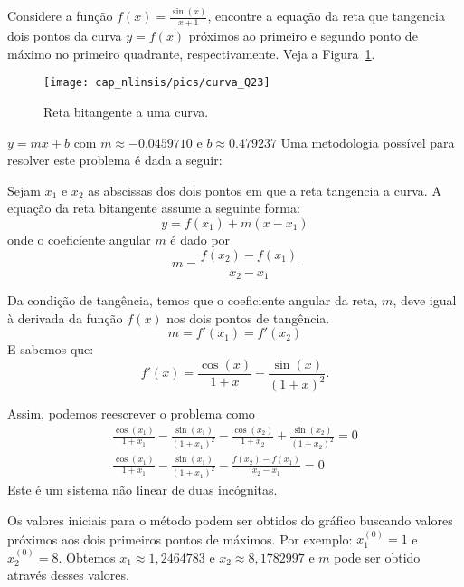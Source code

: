 \begin{exer}\label{prob_bitang}Considere a função $f(x)=\frac{\sin(x)}{x+1}$, encontre a equação da reta que tangencia dois pontos da curva $y=f(x)$ próximos ao primeiro e segundo ponto de máximo no primeiro quadrante, respectivamente. Veja a Figura~\ref{pic:bitang}.
\end{exer}
\begin{figure}
  \centering
  \texttt{[image: cap\_nlinsis/pics/curva\_Q23]}
  \caption{Reta bitangente a uma curva.}
  \label{pic:bitang}
\end{figure}
\begin{resp}
  $y=mx+b$ com $m\approx - 0.0459710 $ e $b\approx 0.479237$
  Uma metodologia possível para resolver este problema é dada a seguir:

  Sejam $x_1$ e $x_2$ as abscissas dos dois pontos em que a reta tangencia a curva. A equação da reta bitangente assume a seguinte forma:
  \begin{equation} y=f(x_1) + m(x-x_1)  \end{equation}
  onde o coeficiente angular $m$ é dado por
  \begin{equation} m=\frac{f(x_2)-f(x_1)}{x_2-x_1} \end{equation}

  Da condição de tangência, temos que o coeficiente angular da reta, $m$, deve igual à derivada da função $f(x)$ nos dois pontos de tangência.
  \begin{equation} m=f'(x_1)=f'(x_2) \end{equation}
  E sabemos que:
  \begin{equation} f'(x)=\frac{\cos(x)}{1+x}-\frac{\sin(x)}{(1+x)^2}. \end{equation}

  Assim, podemos reescrever o problema como
  \begin{eqnarray}
\frac{\cos(x_1)}{1+x_1}-\frac{\sin(x_1)}{(1+x_1)^2}-\frac{\cos(x_2)}{1+x_2}+\frac{\sin(x_2)}{(1+x_2)^2}=0\\
\frac{\cos(x_1)}{1+x_1}-\frac{\sin(x_1)}{(1+x_1)^2}-\frac{f(x_2)-f(x_1)}{x_2-x_1}=0
\end{eqnarray}
Este é um sistema não linear de duas incógnitas.

Os valores iniciais para o método podem ser obtidos do gráfico buscando valores próximos aos dois primeiros pontos de máximos. Por exemplo: $x_1^{(0)}=1$ e $x_2^{(0)}=8$. Obtemos $x_1\approx 1,2464783$ e $x_2\approx 8,1782997$ e $m$ pode ser obtido através desses valores.
\end{resp}

